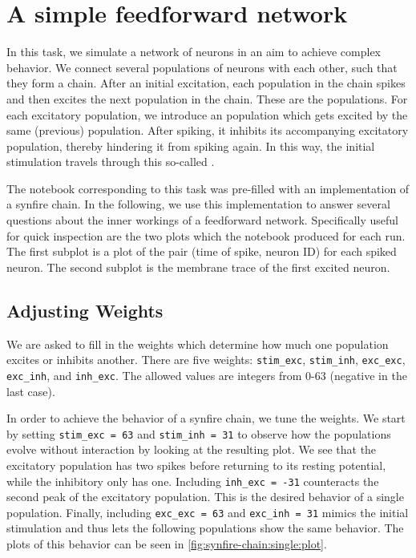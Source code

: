 \section{A simple feedforward network}

In this task, we simulate a network of neurons in an aim to achieve complex behavior.
We connect several populations of neurons with each other, such that they form a chain.
After an initial excitation, each population in the chain spikes and then excites the next population in the chain.
These are the  populations.
For each excitatory population, we introduce an  population which gets excited by the same (previous) population.
After spiking, it inhibits its accompanying excitatory population, thereby hindering it from spiking again.
In this way, the initial stimulation travels through this so-called .

The notebook corresponding to this task was pre-filled with an implementation of a synfire chain.
In the following, we use this implementation to answer several questions about the inner workings of a feedforward network.
Specifically useful for quick inspection are the two plots which the notebook produced for each run.
The first subplot is a plot of the pair (time of spike, neuron ID) for each spiked neuron.
The second subplot is the membrane trace of the first excited neuron.

\subsection{Adjusting Weights}
We are asked to fill in the weights which determine how much one population excites or inhibits another.
There are five weights: \verb|stim_exc|, \verb|stim_inh|, \verb|exc_exc|, \verb|exc_inh|, and \verb|inh_exc|.
The allowed values are integers from 0-63 (negative in the last case).

In order to achieve the behavior of a synfire chain, we tune the weights.
We start by setting \verb|stim_exc = 63| and \verb|stim_inh = 31| to observe how the populations evolve without interaction by looking at the resulting plot.
We see that the excitatory population has two spikes before returning to its resting potential, while the inhibitory only has one.
Including \verb|inh_exc = -31| counteracts the second peak of the excitatory population.
This is the desired behavior of a single population.
Finally, including \verb|exc_exc = 63| and \verb|exc_inh = 31| mimics the initial stimulation and thus lets the following populations show the same behavior.
The plots of this behavior can be seen in \autoref{fig:synfire-chain:single:plot}.


